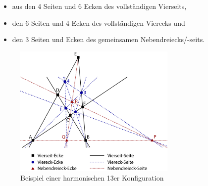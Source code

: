 \documentclass[12pt,a4paper]{article}
\begin{document}
\begin{itemize}
\item[]aus den 4 Seiten und 6 Ecken des vollständigen Vierseits,
\item[]den 6 Seiten und 4 Ecken des vollständigen Vierecks und
\item[]den 3 Seiten und Ecken des gemeinsamen Nebendreiecks/-seits.
\end{itemize}

\begin{figure}[htbp]
\centering
\includegraphics[width=0.7\textwidth]{Bilder/13erKonfigStepbyStep.png}
\caption{Beispiel einer harmonischen 13er Konfiguration}
\label{fig:harmFigur}
\end{figure}
\end{document}
